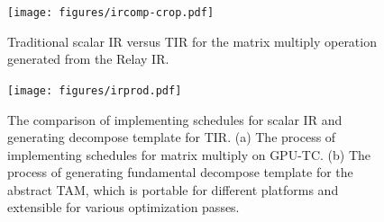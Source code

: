 
\begin{figure}[t]
\centering
\texttt{[image: figures/ircomp-crop.pdf]}
\vspace{-5pt}
\caption{\footnotesize \label{fig:IRComp} Traditional scalar IR versus TIR for the matrix multiply operation generated from the Relay IR.}
\vspace{-10pt}
\end{figure}


\begin{figure}[t]
\centering
\texttt{[image: figures/irprod.pdf]}
\caption{\footnotesize \label{fig:irprod} The comparison of implementing schedules for scalar IR and generating decompose template for TIR. (a) The process of implementing schedules for matrix multiply on GPU-TC. (b) The process of generating fundamental decompose template for the abstract TAM, which is portable for different platforms and extensible for various optimization passes.}
\vspace{-10pt}
\end{figure}



